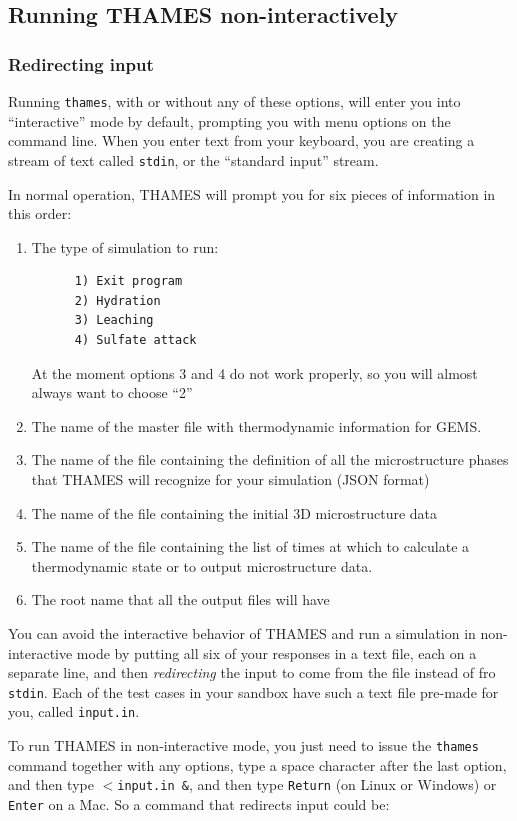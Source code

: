 \documentclass{article}
\begin{document}
\subsection{\label{sec:running} Running THAMES non-interactively}
\subsubsection{\label{sec:redirectinginput} Redirecting input}
Running \verb|thames|, with or without any of these options, will enter you into
``interactive'' mode by default, prompting you with menu options on the command
line. When you enter text from your keyboard, you are creating a stream of text
called \verb|stdin|, or the ``standard input'' stream.

In normal operation, THAMES will prompt you for six pieces of information in
this order:
\begin{enumerate}
	\item The type of simulation to run:
	      \small{
		      \begin{verbatim}
      1) Exit program
      2) Hydration
      3) Leaching
      4) Sulfate attack
    \end{verbatim}
	      } \normalsize
	      At the moment options 3 and 4 do not work properly, so you will almost always
	      want to choose ``2''
	\item The name of the master file with thermodynamic information for GEMS.
	\item The name of the file containing the definition of all the microstructure
	      phases that THAMES will recognize for your simulation (JSON format)
	\item The name of the file containing the initial 3D microstructure data
	\item The name of the file containing the list of times at which to calculate
	      a thermodynamic state or to output microstructure data.
	\item The root name that all the output files will have
\end{enumerate}

You can avoid the interactive behavior of THAMES and run a simulation in
non-interactive mode by putting all six of your responses in a text file, each
on a separate line, and then
\textit{redirecting} the input to come from the file instead of fro
\verb|stdin|. Each of the test cases in your sandbox have such a text file
pre-made for you, called \verb|input.in|.

To run THAMES in non-interactive mode, you just need to issue the \verb|thames|
command together with any options, type a space character after the last option,
and then type $<$\verb|input.in &|, and then type \verb|Return| (on Linux or
Windows) or \verb|Enter| on a Mac. So a command that redirects input could be:
\end{document}
